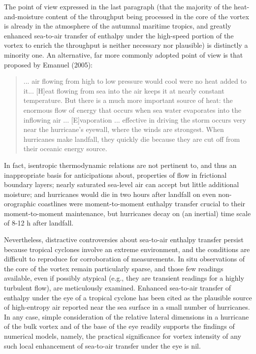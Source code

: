 \documentclass[preprint, prX]{revtex4}
\begin{document}
The point of view expressed in the last paragraph (that the majority of the heat-and-moisture content of the throughput being processed in the core of the vortex is already in the atmosphere of the autumnal maritime tropics, and greatly enhanced sea-to-air transfer of enthalpy under the high-speed portion of the vortex to enrich the throughput is neither necessary nor plausible) is distinctly a minority one. An alternative, far more commonly adopted point of view is that proposed by Emanuel (2005):

\begin{quote}
... air flowing from high to low pressure would cool were no heat added to it... [H]eat flowing from sea into the air keeps it at nearly constant temperature. But there is a much more important source of heat: the enormous flow of energy that occurs when sea water evaporates into the inflowing air ... [E]vaporation ... effective in driving the storm occurs very near the hurricane’s eyewall, where the winds are strongest. When hurricanes make landfall, they quickly die because they are cut off from their oceanic energy source.
\end{quote}

In fact, isentropic thermodynamic relations are not pertinent to, and thus an inappropriate basis for anticipations about, properties of flow in frictional boundary layers; nearly saturated sea-level air can accept but little additional moisture; and hurricanes would die in two hours after landfall on even non-orographic coastlines were moment-to-moment enthalpy transfer crucial to their moment-to-moment maintenance, but hurricanes decay on (an inertial) time scale of 8-12 h after landfall.

Nevertheless, distractive controversies about sea-to-air enthalpy transfer persist because tropical cyclones involve an extreme environment, and the conditions are difficult to reproduce for corroboration of measurements. In situ observations of the core of the vortex remain particularly sparse, and those few readings available, even if possibly atypical (e.g., they are transient readings for a highly turbulent flow), are meticulously examined. Enhanced sea-to-air transfer of enthalpy under the eye of a tropical cyclone has been cited as the plausible source of high-entropy air reported near the sea surface in a small number of hurricanes. In any case, simple consideration of the relative lateral dimensions in a hurricane of the bulk vortex and of the base of the eye readily supports the findings of numerical models, namely, the practical significance for vortex intensity of any such local enhancement of sea-to-air transfer under the eye is nil.
\end{document}
